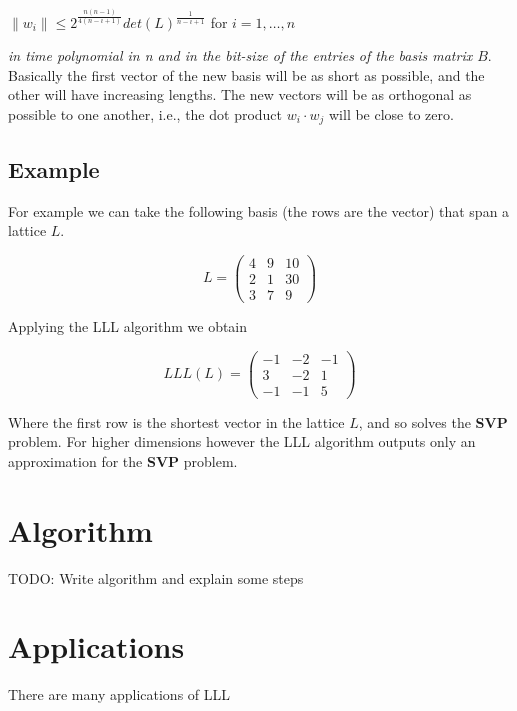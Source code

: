 \documentclass[a4paper,12pt]{report}
\newcommand{\dd}{\cdot}
\begin{document}
\begin{center}
    $\lVert w_i \rVert \le 2^{\frac{n(n-1)}{4(n-i+1)}} det(L)^{\frac{1}{n-i+1}}$ for $i=1,\ldots,n$
\end{center}

\textit{in time polynomial in n and in the bit-size of the entries of the basis matrix $B$}.\\

Basically the first vector of the new basis will be as short as possible, and the other will have increasing lengths. The new vectors
will be as orthogonal as possible to one another, i.e., the dot product $w_i \dd w_j$ will be close to zero.

\subsection*{Example}

For example we can take the following basis (the rows are the vector) that span
a lattice $L$.

\[
L = 
\begin{pmatrix}
    4 & 9 & 10\\
    2 & 1 & 30\\ 
    3 & 7 & 9
\end{pmatrix}
\] 

Applying the LLL algorithm we obtain

\[
LLL(L) = 
\begin{pmatrix}
    -1 & -2 & -1\\
     3 & -2 &  1\\
    -1 & -1 &  5
\end{pmatrix}
\] 

Where the first row is the shortest vector in the lattice $L$, and so solves the \textbf{SVP} problem.
For higher dimensions however the LLL algorithm outputs only an approximation for the \textbf{SVP} problem.

\section{Algorithm}

TODO: Write algorithm and explain some steps

\section{Applications}

There are many applications of LLL
\end{document}
